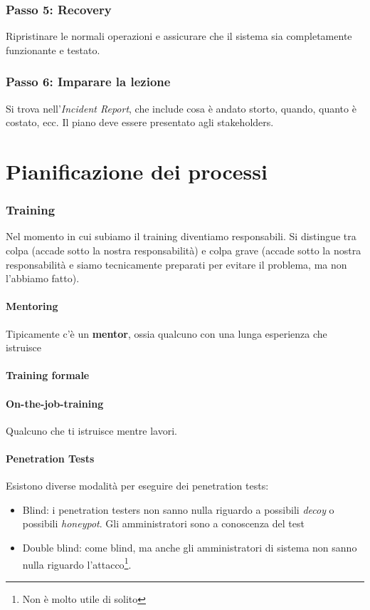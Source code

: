 \subsubsection{Passo 5: Recovery}

Ripristinare le normali operazioni e assicurare che il sistema sia completamente 
funzionante e testato.

\subsubsection{Passo 6: Imparare la lezione}

Si trova nell'\textit{Incident Report}, che include cosa è andato storto, 
quando, quanto è costato, ecc. Il piano deve essere presentato agli 
stakeholders.


\section{Pianificazione dei processi}

\subsubsection{Training}

Nel momento in cui subiamo il training diventiamo responsabili. Si distingue tra 
colpa (accade sotto la nostra responsabilità) e colpa grave (accade sotto la 
nostra responsabilità e siamo tecnicamente preparati per evitare il problema, ma 
non l'abbiamo fatto).

\paragraph*{Mentoring} Tipicamente c'è un \textbf{mentor}, ossia qualcuno con 
una lunga esperienza che istruisce

\paragraph*{Training formale}

\paragraph*{On-the-job-training} Qualcuno che ti istruisce mentre lavori.


\paragraph*{Penetration Tests} Esistono diverse modalità per eseguire dei 
penetration tests:
\begin{itemize}
\item Blind: i penetration testers non sanno nulla riguardo a possibili 
\textit{decoy} o possibili \textit{honeypot}. Gli amministratori sono a 
conoscenza del test
\item Double blind: come blind, ma anche gli amministratori di sistema non sanno 
nulla riguardo l'attacco\footnote{Non è molto utile di solito}.
\end{itemize}

